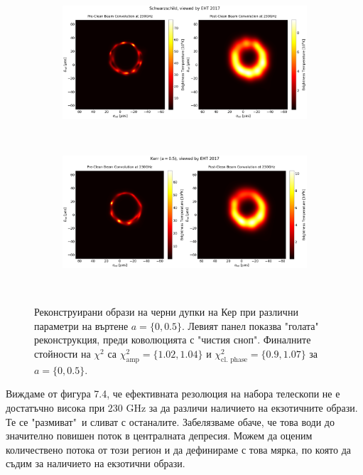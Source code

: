\begin{figure}[h!]
	\centering
	\begin{subfigure}{12cm}
		\hspace{-1.5cm}
		\includegraphics[scale = 0.23]{Ehtim_plot_2017_no_blur_Sch.png}
	\end{subfigure}\\
	\begin{subfigure}{12cm}
		\hspace{-1.5cm}
		\includegraphics[scale = 0.23]{Ehtim_plot_2017_no_blur_Kerr.png}
	\end{subfigure}\\
	\label{Kerr_EHT_2017}
	\caption[Реконструирани образи на черни дупки на Кер при различни параметри на въртене.]{\small Реконструирани образи на черни дупки на Кер при различни параметри на въртене $a = \{0, 0.5\}$. Левият панел показва "голата"$\,$ реконструкция, преди коволюцията с "чистия сноп". Финалните стойности на $\chi^2$ са $\chi^2_\text{amp} = \{1.02, 1.04\}$ и $\chi^2_\text{cl. phase} = \{0.9, 1.07\}$ за $a = \{0, 0.5\}$.} 
\end{figure}

\newpage

Виждаме от фигура 7.4, че ефективната резолюция на набора телескопи не е достатъчно висока при $230$ GHz за да различи наличието на екзотичните образи. Те се "размиват"$\,$ и сливат с останалите. Забелязваме обаче, че това води до значително повишен поток в централната депресия. Можем да оценим количествено потока от този регион и да дефинираме с това мярка, по която да съдим за наличието на екзотични образи. 


